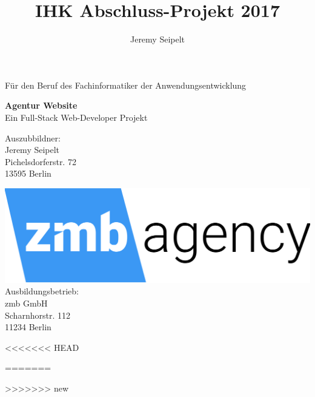 \documentclass[11pt,a4paper]{article}
\author{Jeremy Seipelt}
\title{IHK Abschluss-Projekt 2017}
\begin{document}
\clearpage\maketitle
\thispagestyle{empty}
	\begin{center}
		\begin{Large}


			Für den Beruf des Fachinformatiker der Anwendungsentwicklung\\

		\end{Large}
	\end{center}

 	\begin{center}
		\begin{LARGE}
			 \textbf{Agentur Website}\\
		 Ein Full-Stack Web-Developer Projekt
		\end{LARGE}
	\end{center}

	\begin{center}
	Auszubbildner: \\
 	Jeremy Seipelt\\
 	Pichelsdorferstr. 72\\
	 13595 Berlin\\
	\end{center}

	\begin{center}
		\includegraphics[scale=0.05]{logo_zmb}\\
 		Ausbildungsbetrieb:\\
 		zmb GmbH\\
 		Scharnhorstr. 112\\
 		11234 Berlin \\
 	\end{center}
\newpage
\tableofcontents
\newpage
\begin{acronym}
<<<<<<< HEAD


=======
 
>>>>>>> new

\end{acronym}
\begin{acronym}[Allgemein]
\end{acronym}
\newpage
\setcounter{page}{1}
\end{document}
